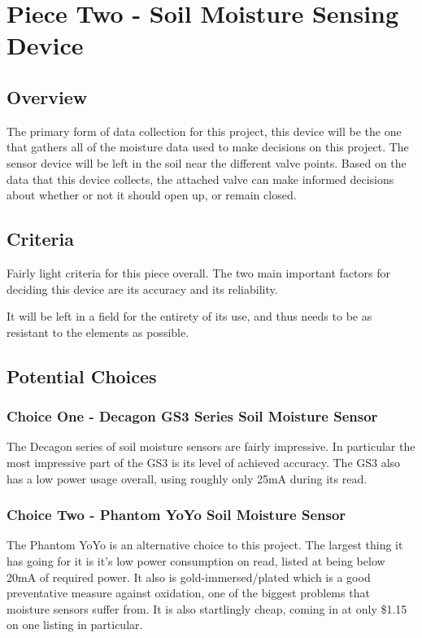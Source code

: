 \documentclass[onecolumn, draftclsnofoot,10pt, compsoc]{IEEEtran}
\begin{document}
    \section{Piece Two - Soil Moisture Sensing Device}
    \subsection{Overview}
    The primary form of data collection for this project, this device will be the one that gathers all of the moisture data used to make decisions on this project.
    The sensor device will be left in the soil near the different valve points.
    Based on the data that this device collects, the attached valve can make informed decisions about whether or not it should open up, or remain closed.
    
    \subsection{Criteria}
    Fairly light criteria for this piece overall.
    The two main important factors for deciding this device are its accuracy and its reliability.\par
    It will be left in a field for the entirety of its use, and thus needs to be as resistant to the elements as possible.
    \subsection{Potential Choices}
    \subsubsection{Choice One - Decagon GS3 Series Soil Moisture Sensor}
    The Decagon series of soil moisture sensors are fairly impressive.
    In particular the most impressive part of the GS3 is its level of achieved accuracy. The GS3 also has a low power usage overall, using roughly only 25mA during its read.
    
    \subsubsection{Choice Two - Phantom YoYo Soil Moisture Sensor}
    The Phantom YoYo is an alternative choice to this project.
    The largest thing it has going for it is it's low power consumption on read, listed at being below 20mA of required power.
    It also is gold-immersed/plated which is a good preventative measure against oxidation, one of the biggest problems that moisture sensors suffer from.
    It is also startlingly cheap, coming in at only \$1.15 on one listing in particular.
\end{document}
